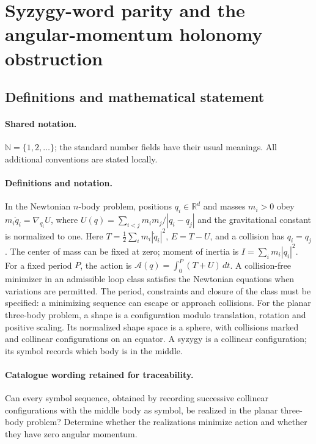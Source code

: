 \documentclass[11pt]{article}
\begin{document}
\section{Syzygy-word parity and the angular-momentum holonomy obstruction}\label{statement}

\subsection{Definitions and mathematical statement}

\paragraph{Shared notation.}$\mathbb N=\{1,2,\ldots\}$; the standard number fields have their usual meanings. All additional conventions are stated locally.


\paragraph{Definitions and notation.}In the Newtonian $n$-body problem, positions $q_i\in\mathbb R^d$ and masses $m_i>0$ obey $m_i\ddot q_i=\nabla_{q_i}U$, where $U(q)=\sum_{i<j}m_im_j/|q_i-q_j|$ and the gravitational constant is normalized to one. Here $T=\tfrac12\sum_i m_i|\dot q_i|^2$, $E=T-U$, and a collision has $q_i=q_j$. The center of mass can be fixed at zero; moment of inertia is $I=\sum_i m_i|q_i|^2$. For a fixed period $P$, the action is $\mathcal A(q)=\int_0^P(T+U)\,dt$. A collision-free minimizer in an admissible loop class satisfies the Newtonian equations when variations are permitted. The period, constraints and closure of the class must be specified: a minimizing sequence can escape or approach collisions. For the planar three-body problem, a shape is a configuration modulo translation, rotation and positive scaling. Its normalized shape space is a sphere, with collisions marked and collinear configurations on an equator. A syzygy is a collinear configuration; its symbol records which body is in the middle. 

\paragraph{Catalogue wording retained for traceability.}
Can every symbol sequence, obtained by recording successive collinear configurations with the middle body as symbol, be realized in the planar three-body problem? Determine whether the realizations minimize action and whether they have zero angular momentum.
\end{document}
